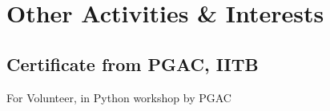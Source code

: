 \documentclass{article}
\begin{document}
\section{Other Activities \& Interests}
	\subsection{Certificate from PGAC, IITB}
		For Volunteer, in Python workshop by PGAC
		\begin{figure}[h]
		\end{figure}

\newpage
\end{document}
